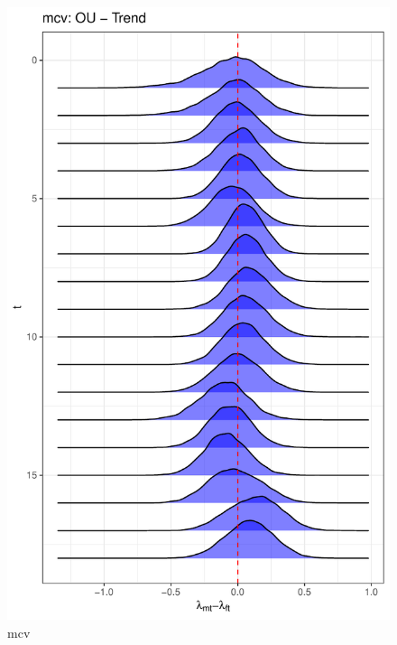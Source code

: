 \documentclass[
  12pt,
]{article}
\begin{document}
\begin{figure}

{\centering \includegraphics[width=0.9\linewidth]{../Figures/mcv/lambda_diff} 

}

\caption{mcv}\label{fig:unnamed-chunk-16}
\end{figure}
\end{document}
